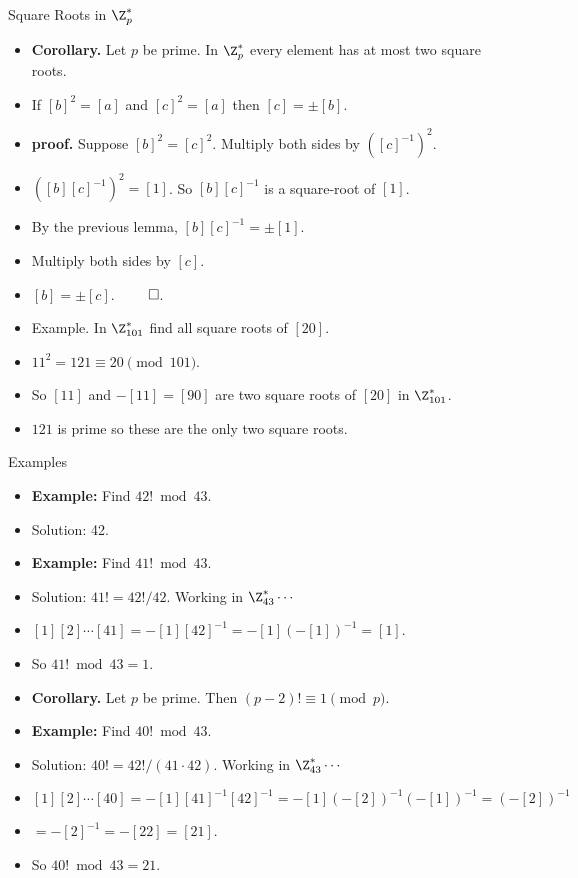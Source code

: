 \documentclass[handout]{beamer}
\begin{document}
\begin{frame}{Square Roots in $\Z_p^*$}
\begin{itemize}
  \item \textbf{Corollary.} Let $p$ be prime. In $\Z_p^*$ every element has at most two square roots.
  \item If $[b]^2 = [a]$ and $[c]^2 = [a]$ then $[c]=\pm [b]$.
  \item \textbf{proof.} Suppose $[b]^2=[c]^2$. Multiply both sides by $([c]^{-1})^2$.
  \item $([b][c]^{-1})^2 = [1]$. So $[b][c]^{-1}$ is a square-root of $[1]$.
  \item By the previous lemma, $[b][c]^{-1}=\pm[1]$.
  \item Multiply both sides by $[c]$.
  \item $[b]=\pm[c]$. $\qed$.
  \item Example. In $\Z_{101}^*$ find all square roots of $[20]$.
  \item $11^2=121\equiv 20 \pmod{101}$.
  \item So $[11]$ and $-[11]=[90]$ are two square roots of $[20]$ in $\Z_{101}^*$.
  \item $121$ is prime so these are the only two square roots.
\end{itemize}
\end{frame}

\begin{frame}{Examples}
\begin{itemize}
  \item \textbf{Example:} Find $42! \bmod 43$.
  \item Solution: 42.
  \item \textbf{Example:} Find $41! \bmod 43$.
  \item Solution: $41! = 42!/42$. Working in $\Z_{43}^* \cdots$
  \item $[1][2]\cdots[41] = -[1][42]^{-1}=-[1](-[1])^{-1} = [1]$.
  \item So $41! \bmod 43 = 1$.
  \item \textbf{Corollary.} Let $p$ be prime. Then $(p-2)! \equiv 1 \pmod{p}$.
  \item \textbf{Example:} Find $40!  \bmod 43$.
  \item Solution: $40! = 42!/(41\cdot 42)$. Working in $\Z_{43}^* \cdots$
  \item $[1][2]\cdots[40] = -[1][41]^{-1}[42]^{-1}=-[1](-[2])^{-1}(-[1])^{-1} = (-[2])^{-1}$
  \item $= -[2]^{-1} = -[22] = [21]$.
  \item So $40! \bmod 43=21$.
\end{itemize}
\end{frame}
\end{document}
